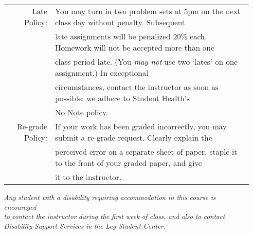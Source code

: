 \documentclass[10pt]{article}
\begin{document}
\begin{tabular}{rl}
Late Policy:		& You may turn in two problem sets at 5pm on the next class day without penalty. Subsequent\\
     				& late assignments will be penalized 20\% each.  Homework will not be accepted more than one\\
				& class period late.  (You \textit{may not} use two `lates' on one assignment.) In exceptional \\
				& circumstances, contact the instructor as soon as possible:  we adhere to Student Health's \\
				& \href{http://health.rice.edu/Content.aspx?id=98}{No Note} policy.\\[1.25em] 
				
Re-grade Policy: 	& If your work has been graded incorrectly, you may submit a re-grade request. Clearly explain the\\
				& perceived error on a separate sheet of paper, staple it to the front of your graded paper, and give\\
				& it to the instructor. \\[1.25em]

\hline
\end{tabular}
\begin{center}
\em Any student with a disability requiring accommodation in this course is encouraged\\
to contact the instructor during the first week of class, and also to contact\\
 Disability Support Services in the Ley Student Center.
\end{center}
\newpage
\vspace{-1em}
\hspace*{-3em}
\end{document}
